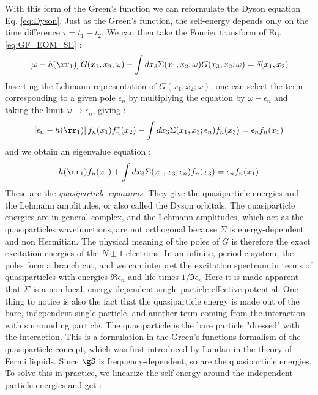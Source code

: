 With this form of the Green's function we can reformulate the Dyson equation Eq. \eqref{eq:Dyson}. Just as the Green's function, the self-energy depends only on the time difference $\tau = t_1 - t_2$. We can then take the Fourier transform of Eq. \eqref{eq:GF_EOM_SE} :
\begin{equation}
	\left[ \omega - h(\rr_1) \right] G(x_1,x_2;\omega) - \int dx_3 \Sigma(x_1,x_2;\omega) G(x_3,x_2;\omega) = \delta(x_1,x_2)
\end{equation}
Inserting the Lehmann representation of $G(x_1,x_2;\omega)$, one can select the term corresponding to a given pole $\epsilon_n$ by multiplying the equation by $\omega - \epsilon_n$ and taking the limit $\omega \to \epsilon_n$, giving :
\begin{equation}
	\left[ \epsilon_n - h(\rr_1) \right] f_n(x_1)f^*_n(x_2) - \int dx_3 \Sigma(x_1,x_3;\epsilon_n) f_n(x_3) = \epsilon_n f_n(x_1)
\end{equation}
and we obtain an eigenvalue equation :
\begin{equation}
	h(\rr_1)f_n(x_1) + \int dx_3 \Sigma(x_1,x_3;\epsilon_n)f_n(x_3) = \epsilon_n f_n(x_1)
\end{equation}
These are the \textit{quasiparticle equations}. They give the quasiparticle energies and the Lehmann amplitudes, or also called the Dyson orbitals. The quasiparticle energies are in general complex, and the Lehmann amplitudes, which act as the quasiparticles wavefunctions, are not orthogonal because $\Sigma$ is energy-dependent and non Hermitian. The physical meaning of the poles of $G$ is therefore the exact excitation energies of the $N\pm1$ electrons. In an infinite, periodic system, the poles form a branch cut, and we can interpret the excitation spectrum in terms of quasiparticles with energies $\Re\epsilon_n$ and life-times $1/\Im\epsilon_n$
Here it is made apparent that $\Sigma$ is a non-local, energy-dependent single-particle effective potential. One thing to notice is also the fact that the quasiparticle energy is made out of the bare, independent single particle, and another term coming from the interaction with surrounding particle. The quasiparticle is the bare particle "dressed" with the interaction. This is a formulation in the Green's functions formalism of the quasiparticle concept, which was first introduced by Landau in the theory of Fermi liquids. \cite{landau1957oscillations}
Since $\gS$ is frequency-dependent, so are the quasiparticle energies. To solve this in practice, we linearize the self-energy around the independent particle energies and get :
